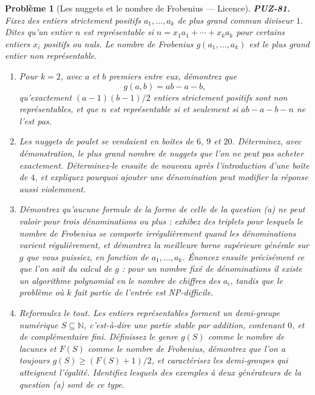 \documentclass[11pt]{article}
\newtheorem{problem}{Problème}
\begin{document}
\begin{problem}[{Les nuggets et le nombre de Frobenius --- Licence}]
\textbf{PUZ-81.} Fixez des entiers strictement positifs $ a_1, \dots, a_k $ de plus
grand commun diviseur $ 1 $. Dites qu'un entier $ n $ est \textit{représentable} si
$ n = x_1 a_1 + \cdots + x_k a_k $ pour certains entiers $ x_i $ positifs ou nuls. Le
\textit{nombre de Frobenius} $ g(a_1, \dots, a_k) $ est le plus grand entier non
représentable.
\begin{enumerate}
\item[(a)] Pour $ k = 2 $, avec $ a $ et $ b $ premiers entre eux, démontrez que
\[ g(a,b) = ab - a - b, \]
qu'exactement $ (a-1)(b-1)/2 $ entiers strictement positifs sont non représentables, et
que $ n $ est représentable si et seulement si $ ab - a - b - n $ ne l'est pas.
\item[(b)] Les nuggets de poulet se vendaient en boîtes de $ 6 $, $ 9 $ et $ 20 $.
Déterminez, avec démonstration, le plus grand nombre de nuggets que l'on ne peut pas acheter
exactement. Déterminez-le ensuite de nouveau après l'introduction d'une boîte de $ 4 $, et
expliquez pourquoi ajouter une dénomination peut modifier la réponse aussi violemment.
\item[(c)] Démontrez qu'aucune formule de la forme de celle de la question (a) ne peut valoir pour
trois dénominations ou plus : exhibez des triplets pour lesquels le nombre de Frobenius se
comporte irrégulièrement quand les dénominations varient régulièrement, et démontrez la
meilleure borne supérieure générale sur $ g $ que vous puissiez, en fonction de
$ a_1, \dots, a_k $. Énoncez ensuite précisément ce que l'on sait du calcul de $ g $ :
pour un nombre fixé de dénominations il existe un algorithme polynomial en le nombre de
chiffres des $ a_i $, tandis que le problème où $ k $ fait partie de l'entrée est
NP-difficile.
\item[(d)] Reformulez le tout. Les entiers représentables forment un \textit{demi-groupe numérique}
$ S \subseteq \mathbb{N} $, c'est-à-dire une partie stable par addition, contenant
$ 0 $, et de complémentaire fini. Définissez le \textit{genre} $ g(S) $ comme le nombre de
lacunes et $ F(S) $ comme le nombre de Frobenius, démontrez que l'on a toujours
$ g(S) \ge (F(S)+1)/2 $, et caractérisez les demi-groupes qui atteignent l'égalité.
Identifiez lesquels des exemples à deux générateurs de la question (a) sont de ce type.
\end{enumerate}

\end{problem}
\end{document}
